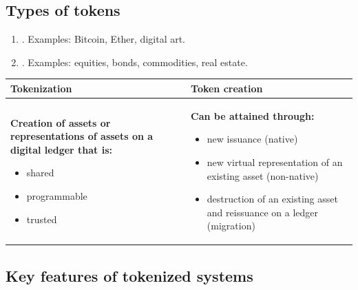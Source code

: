 \subsection*{Types of tokens}

\begin{enumerate}
\item {}. Examples: Bitcoin, Ether, digital art.
\item {}. Examples: equities, bonds, commodities, real estate.
\end{enumerate}

\begin{center}
\renewcommand{\arraystretch}{1.25}
\begin{tabularx}{\textwidth}{@{}>{\raggedright\arraybackslash}X >{\raggedright\arraybackslash}X@{}}
\toprule
\rowcolor{PaleNavy}
{\sffamily\bfseries\color{FRMNavy}Tokenization} &
{\sffamily\bfseries\color{FRMNavy}Token creation}\\
\midrule
\textbf{Creation of assets or representations of assets on a digital ledger that is:}
\begin{itemize}[leftmargin=12pt, topsep=3pt, itemsep=1pt]
\item shared
\item programmable
\item trusted
\end{itemize}
&
\textbf{Can be attained through:}
\begin{itemize}[leftmargin=12pt, topsep=3pt, itemsep=1pt]
\item new issuance (native)
\item new virtual representation of an existing asset (non-native)
\item destruction of an existing asset and reissuance on a ledger (migration)
\end{itemize}\\
\bottomrule
\end{tabularx}
\end{center}

\subsection*{Key features of tokenized systems}

